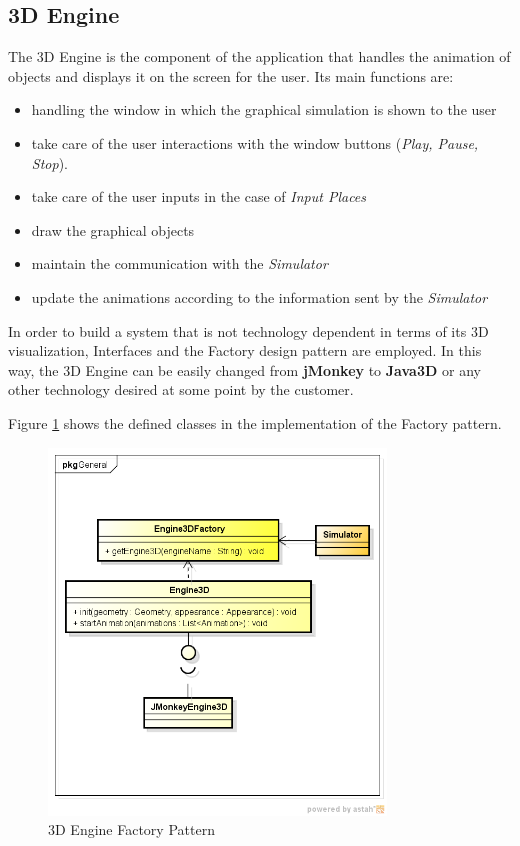 \subsection{3D Engine}
\label{sec:3d-engine}

The 3D Engine is the component of the application that handles the animation of objects and displays it on the screen for the user. Its main functions are: 

\begin{itemize}
\item handling the window in which the graphical simulation is shown to the user
\item take care of the user interactions with the window buttons (\textit{Play, Pause, Stop}).
\item take care of the user inputs in the case of \textit{Input Places}
\item draw the graphical objects
\item maintain the communication with the \textit{Simulator}
\item update the animations according to the information sent by the \textit{Simulator}
\end{itemize}

In order to build a system that is not technology dependent in terms of its 3D visualization, Interfaces and the Factory design pattern are employed. In this way, the 3D Engine can be easily changed from \textbf{jMonkey} to \textbf{Java3D} or any other technology desired at some point by the customer. 

Figure \ref{fig:factory} shows the defined classes in the implementation of the Factory pattern.

\begin{figure}[htp]
\begin{center}
  \includegraphics[width=0.8\textwidth]{image/engine_factory.png}
  \caption{3D Engine Factory Pattern}
  \label{fig:factory}
\end{center}
\end{figure} 

